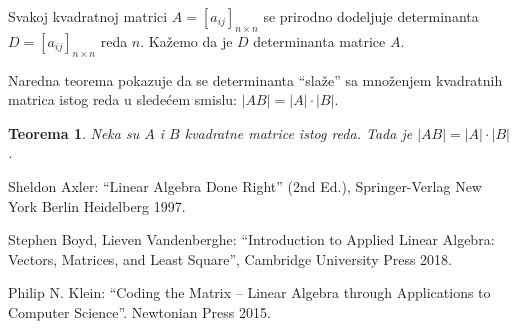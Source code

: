 \documentclass[11pt]{article}
\theoremstyle{masulthm}
\newtheorem{theorem}{Teorema}[section]
\theoremstyle{masuldef}
\theoremstyle{masulexmp}
\theoremstyle{masulproof}
\begin{document}
Svakoj kvadratnoj matrici $ A = [a_{ij}]_{n \times n} $ se prirodno dodeljuje determinanta
$ D = [a_{ij}]_{n \times n} $ reda $ n $. Kažemo da je $ D $ determinanta matrice $ A $.

Naredna teorema pokazuje da se determinanta ``slaže'' sa množenjem kvadratnih matrica istog reda
u sledećem smislu: $ |AB| = |A| \cdot |B| $.

\begin{theorem}
  Neka su $ A $ i $ B $ kvadratne matrice istog reda. Tada je $ |AB| = |A| \cdot |B| $.
\end{theorem}

\begin{thebibliography}{9}
Sheldon Axler: ``Linear Algebra Done Right'' (2nd Ed.), Springer-Verlag New York Berlin Heidelberg 1997.

Stephen Boyd, Lieven Vandenberghe: ``Introduction to Applied Linear Algebra: Vectors, Matrices, and Least Square'',
Cambridge University Press 2018.

Philip N. Klein: ``Coding the Matrix -- Linear Algebra through Applications to Computer Science''.
Newtonian Press 2015.

\end{thebibliography}
\end{document}
